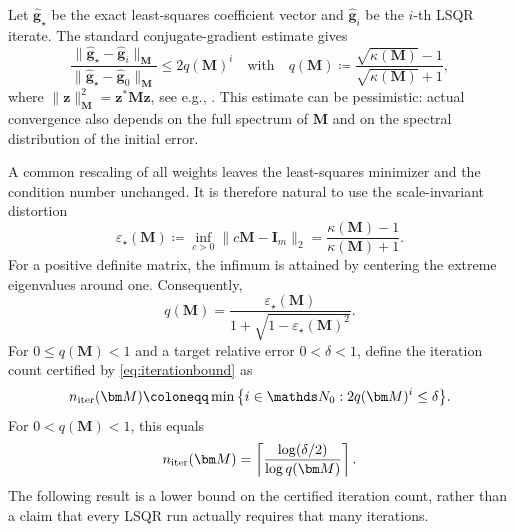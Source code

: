 \documentclass[a4paper]{amsart}
\numberwithin{equation}{section}
\begin{document}
Let $\widehat{\bm g}_\star$ be the exact least-squares coefficient vector and $\widehat{\bm g}_i$ be the $i$-th LSQR iterate.
The standard conjugate-gradient estimate gives
\begin{equation}\label{eq:iterationbound}
    \frac{\|\bm{\hat g}_\star-\bm{\hat g}_i\|_{\bm M}}{\|\bm{\hat g}_\star-\bm{\hat g}_0\|_{\bm M}}
    \le 2q(\bm M)^i
    \quad\text{with}\quad
    q(\bm M)
    \coloneqq
    \frac{\sqrt{\kappa(\bm M)}-1}
         {\sqrt{\kappa(\bm M)}+1},
\end{equation}
where $\|\bm z\|_{\bm M}^2=\bm z^\ast\bm M\bm z$, see e.g., \cite[Theorem~3.1.1]{Gre97}.
This estimate can be pessimistic: actual convergence also depends on the full spectrum of $\bm M$ and on the spectral distribution of the initial error.

A common rescaling of all weights leaves the least-squares minimizer and the condition number unchanged.
It is therefore natural to use the scale-invariant distortion
\begin{equation}\label{eq:scaleinvariantdistortion}
    \varepsilon_\star(\bm M)
    \coloneqq \inf_{c>0}\|c\bm M-\bm I_m\|_2
    =\frac{\kappa(\bm M)-1}{\kappa(\bm M)+1}.
\end{equation}
For a positive definite matrix, the infimum is attained by centering the extreme eigenvalues around one.
Consequently,
\begin{equation}\label{eq:qepsilon}
    q(\bm M)
    =\frac{\varepsilon_\star(\bm M)}
    {1+\sqrt{1-\varepsilon_\star(\bm M)^2}}.
\end{equation}
For $0\le q(\bm M)<1$ and a target relative error $0<\delta<1$, define the iteration count certified by \eqref{eq:iterationbound} as
\begin{equation}\label{eq:certifiediterations}
    n_{\rm iter}(\bm M)
    \coloneqq
    \min\big\{i\in\mathds N_0:2q(\bm M)^i\le\delta\big\}.
\end{equation}
For $0<q(\bm M)<1$, this equals
\begin{equation}\label{eq:certifiediterationsformula}
    n_{\rm iter}(\bm M)
    =\left\lceil\frac{\log(\delta/2)}{\log q(\bm M)}\right\rceil.
\end{equation}
The following result is a lower bound on the certified iteration count, rather than a claim that every LSQR run actually requires that many iterations.
\end{document}
